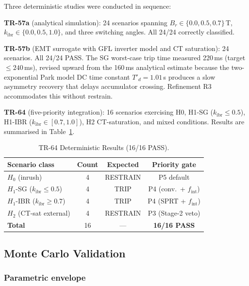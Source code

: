 \documentclass[journal,twoside,10pt]{IEEEtran}
\newcommand{\kibr}{k_{\mathrm{ibr}}}
\newcommand{\fint}{f_{\mathrm{int}}}
\begin{document}
Three deterministic studies were conducted in sequence:

\textbf{TR-57a} (analytical simulation): 24 scenarios spanning
$B_r \in \{0.0, 0.5, 0.7\}$\,T, $\kibr \in \{0.0, 0.5, 1.0\}$,
and three switching angles.
All 24/24 correctly classified.

\textbf{TR-57b} (EMT surrogate with GFL inverter model and CT saturation):
24 scenarios.
All 24/24 PASS.
The SG worst-case trip time measured 220\,ms (target $\leq 240$\,ms),
revised upward from the 160\,ms analytical estimate because the
two-exponential Park model DC time constant $T'_d = 1.01\,$s produces
a slow asymmetry recovery that delays accumulator crossing.
Refinement R3 accommodates this without restrain.

\textbf{TR-64} (five-priority integration): 16 scenarios exercising
H0, H1-SG ($\kibr \leq 0.5$), H1-IBR ($\kibr \in [0.7, 1.0]$),
H2 CT-saturation, and mixed conditions.
Results are summarised in Table~\ref{tab:det}.

\begin{table}[!t]
\centering
\caption{TR-64 Deterministic Results (16/16 PASS).}
\label{tab:det}
\renewcommand{\arraystretch}{1.06}
\footnotesize\setlength{\tabcolsep}{4pt}
\begin{tabular}{p{2.8cm}ccc}
\toprule
Scenario class & Count & Expected & Priority gate \\
\midrule
$H_0$ (inrush)              & 4  & RESTRAIN & P5 default \\
$H_1$-SG ($\kibr \leq 0.5$) & 4  & TRIP     & P4 (conv.\ + $\fint$) \\
$H_1$-IBR ($\kibr \geq 0.7$)& 4  & TRIP     & P4 (SPRT + $\fint$) \\
$H_2$ (CT-sat external)     & 4  & RESTRAIN & P3 (Stage-2 veto) \\
\midrule
\textbf{Total}              & 16 & ---      & \textbf{16/16 PASS} \\
\bottomrule
\end{tabular}
\end{table}

\subsection{Monte Carlo Validation}
\label{sec:mc}

\subsubsection{Parametric envelope}
\end{document}
